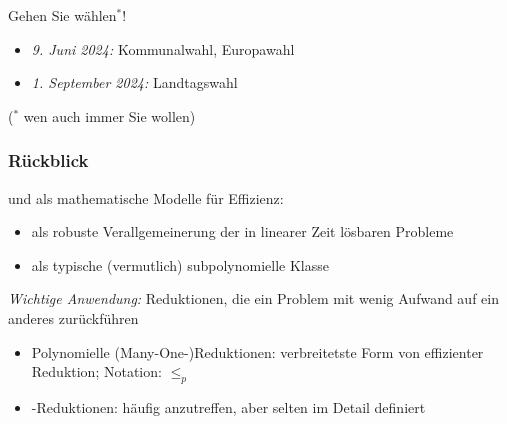 \documentclass[aspectratio=1610,onlymath]{beamer}
\begin{document}
\maketitle

\begin{frame}%

\vspace{5mm}

\bigskip
\pause

{{\Large Gehen Sie wählen$^*$!} }\medskip

\begin{itemize}
\item \emph{9. Juni 2024:} Kommunalwahl, Europawahl
\item \emph{1. September 2024:} Landtagswahl
\end{itemize}\smallskip

\smallskip

{\tiny ($^*$ wen auch immer Sie wollen)}

\end{frame}

\begin{frame}\frametitle{Rückblick}

 und  als mathematische Modelle für Effizienz:
\begin{itemize}
\item {} als robuste Verallgemeinerung der in linearer Zeit lösbaren Probleme
\item {} als typische (vermutlich) subpolynomielle Klasse
\end{itemize}\bigskip

\emph{Wichtige Anwendung:} Reduktionen, die ein Problem mit wenig Aufwand auf ein anderes zurückführen
\begin{itemize}
\item \alert{Polynomielle (Many-One-)Reduktionen:} verbreitetste Form von effizienter Reduktion; Notation: $\leq_p$
\item \alert{-Reduktionen:} häufig anzutreffen, aber selten im Detail definiert
\end{itemize}

\end{frame}
\end{document}

